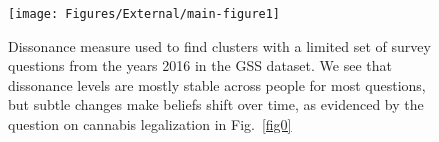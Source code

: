 \documentclass[onecolumn, compsoc,11pt]{IEEEtran}
\makeatletter
\renewcommand\subsubsection{\@startsection {section}{1}{\z@}%
                                   {0ex \@plus -.5ex \@minus -.2ex}%
                                   {0.0ex \@plus.5ex}%
                                   {\fontsize{10}{10}\selectfont\bfseries\sffamily\color{Red4}}}
\renewcommand{\captionN}[1]{\caption{\color{CadetBlue4!80!black} \sffamily \fontsize{10}{11}\selectfont #1  }}
\newif\iftikzX
\makeatother
\begin{document}
 \def\I{\mathds{I}}
 \def\D{\mathfrak{D}}
 \def\Q{\mathds{Q}}
 \def\R{X}
 \def\supp{\mathop{\mathsf{supp}}}
 \def\u{\boldsymbol{u}}
\begin{figure}[!t]
  \vspace{-10pt}
  
\iftikzX
    \hspace{-25pt}

  \vspace{-22pt}
  \else \texttt{[image: Figures/External/main-figure1]}
  \vspace{-15pt}
  \fi

  
  \captionN{Dissonance measure used to find clusters with a limited set of survey questions from the years 2016  in the GSS dataset. We see that dissonance levels are mostly stable across people for most questions, but subtle changes make beliefs shift over time, as evidenced by the question on cannabis legalization in Fig.~\ref{fig0}}\label{fig1}
  \vspace{-20pt}
  
\end{figure}
\end{document}
